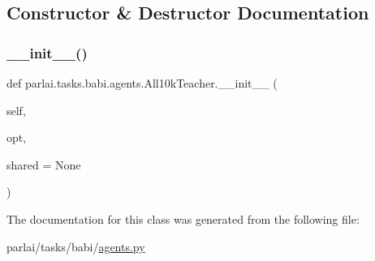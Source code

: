 \subsection{Constructor \& Destructor Documentation}
\mbox{\label{classparlai_1_1tasks_1_1babi_1_1agents_1_1All10kTeacher_a6216cea03cc9b69cea9782819e2ede1d}} 
\subsubsection{\texorpdfstring{\+\_\+\+\_\+init\+\_\+\+\_\+()}{\_\_init\_\_()}}
{\footnotesize\ttfamily def parlai.\+tasks.\+babi.\+agents.\+All10k\+Teacher.\+\_\+\+\_\+init\+\_\+\+\_\+ (\begin{DoxyParamCaption}\item[{}]{self,  }\item[{}]{opt,  }\item[{}]{shared = {\ttfamily None} }\end{DoxyParamCaption})}



The documentation for this class was generated from the following file\+:\begin{DoxyCompactItemize}
\item 
parlai/tasks/babi/\hyperlink{parlai_2tasks_2babi_2agents_8py}{agents.\+py}\end{DoxyCompactItemize}
